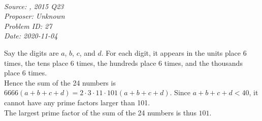 \SSbreak\\
\emph{Source: \Csmc, 2015 Q23}\\
\emph{Proposer: Unknown}\\
\emph{Problem ID: 27}\\
\emph{Date: 2020-11-04}\\
\SSbreak

\bigskip

\begin{solution}\hfil\medskip 

    Say the digits are $a$, $b$, $c$, and $d$. For each digit, it appears in the units place 6 times,
     the tens place 6 times, the hundreds place 6 times, and the thousands place 6 times. \\

    Hence the sum of the 24 numbers is $6666(a+b+c+d) = 2 \cdot 3 \cdot 11 \cdot 101 (a+b+c+d)$.
     Since $a+b+c+d < 40$, it cannot have any prime factors larger than 101. \\

    The largest prime factor of the sum of the 24 numbers is thus $\boxed{101}$. 
\end{solution}\bigskip